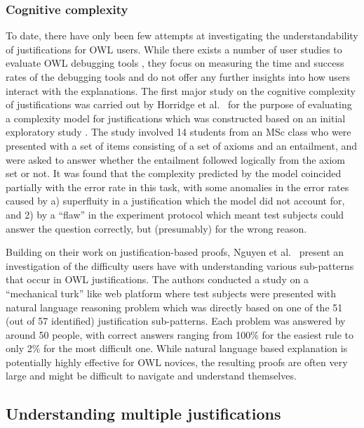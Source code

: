 \subsubsection{Cognitive complexity}

To date, there have only been few attempts at investigating the understandability of justifications for OWL users. While there exists a number of user studies to evaluate OWL debugging tools \cite{kalyanpur05mi,lam07aa}, they focus on measuring the time and success rates of the debugging tools and do not offer any further insights into how users interact with the explanations. The first major study on the cognitive complexity of justifications was carried out by Horridge et al.\ \cite{horridge11gj} for the purpose of evaluating a complexity model for justifications which was constructed based on an initial exploratory study \cite{horridge11si}. The study involved 14 students from an MSc class who were presented with a set of items consisting of a set of axioms and an entailment, and were asked to answer whether the entailment followed logically from the axiom set or not. It was found that the complexity predicted by the model coincided partially with the error rate in this task, with some anomalies in the error rates caused by a) superfluity in a justification which the model did not account for, and 2) by a \enquote{flaw} in the experiment protocol which meant test subjects could answer the question correctly, but (presumably) for the wrong reason.

Building on their work on justification-based proofs, Nguyen et al.\ \cite{nguyen12ab}  present an investigation of the difficulty users have with understanding various sub-patterns that occur in OWL justifications. The authors conducted a study on a \enquote{mechanical turk} like web platform where test subjects were presented with natural language reasoning problem which was directly based on one of the 51 (out of 57 identified) justification sub-patterns. Each problem was answered by around 50 people, with correct answers ranging from 100\% for the easiest rule to only 2\% for the most difficult one. While natural language based explanation is potentially highly effective for OWL novices, the resulting proofs are often very large and might be difficult to navigate and understand themselves. 


\subsection{Understanding multiple justifications}

